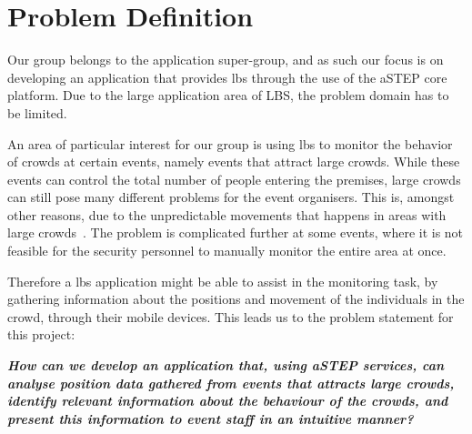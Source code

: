 \section{Problem Definition} \label{sec:problem_def}
Our group belongs to the application super-group, and as such our focus is on developing an application that provides \gls{lbs} through the use of the aSTEP core platform. Due to the large application area of LBS, the problem domain has to be limited. 

An area of particular interest for our group is using \gls{lbs} to monitor the behavior of crowds at certain events, namely events that attract large crowds. While these events can control the total number of people entering the premises, large crowds can still pose many different problems for the event organisers. This is, amongst other reasons, due to the unpredictable movements that happens in areas with large crowds~\cite{wirz2012inferring}. The problem is complicated further at some events, where it is not feasible for the security personnel to manually monitor the entire area at once. 

Therefore a \gls{lbs} application might be able to assist in the monitoring task, by gathering information about the positions and movement of the individuals in the crowd, through their mobile devices. This leads us to the problem statement for this project:

\vspace{0.5 cm}
\begin{center}
	\textbf{\textit{How can we develop an application that, using aSTEP services, can analyse position data gathered from events that attracts large crowds, identify relevant information about the behaviour of the crowds, and present this information to event staff in an intuitive manner?}}
\end{center}